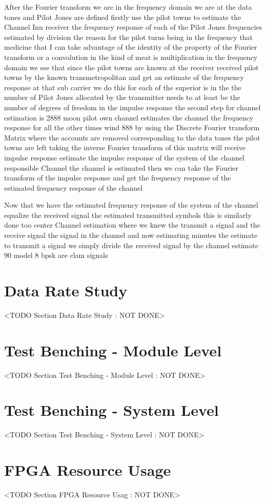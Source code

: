 After the Fourier transform we are in the frequency domain we are at the data tones and Pilot Jones are defined firstly use the pilot towns to estimate the Channel Inn receiver the frequency response of each of the Pilot Jones frequencies estimated by division the reason for the pilot turns being in the frequency that medicine that I can take advantage of the identity of the property of the Fourier transform or a convolution in the kind of meat is multiplication in the frequency domain we see that since the pilot towns are known at the receiver received pilot towns by the known transmetropolitan and get an estimate of the frequency response at that sub carrier we do this for each of the superior is in the the number of Pilot Jones allocated by the transmitter needs to at least be the number of degrees of freedom in the impulse response the second step for channel estimation is 2888 moon pilot own channel estimates the channel the frequency response for all the other times wind 888 by using the Discrete Fourier transform Matrix where the accounts are removed corresponding to the data tones the pilot towns are left taking the inverse Fourier transform of this matrix will receive impulse response estimate the impulse response of the system of the channel responsible Channel the channel is estimated then we can take the Fourier transform of the impulse response and get the frequency response of the estimated frequency response of the channel

Now that we have the estimated frequency response of the system of the channel equalize the received signal the estimated transmitted symbols this is similarly done too center Channel estimation where we knew the transmit a signal and the receive signal the signal in the channel and now estimating minutes the estimate to transmit a signal we simply divide the received signal by the channel estimate 90 model 8 bpsk are clam signals

\section{Data Rate Study}
	<TODO Section Data Rate Study : NOT DONE>
\section{Test Benching - Module Level}
	<TODO Section Test Benching - Module Level : NOT DONE>
\section{Test Benching - System Level}
	<TODO Section Test Benching - System Level : NOT DONE>
\section{FPGA Resource Usage}	<TODO Section FPGA Resource Usag : NOT DONE>
